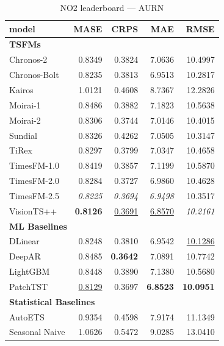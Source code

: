 \begin{table}[H]
\caption{NO2 leaderboard --- AURN}
\centering
\begin{small}
\begin{tabular}{lrrrr}
\toprule
model & MASE & CRPS & MAE & RMSE \\
\midrule
\multicolumn{5}{l}{\textbf{TSFMs}} \\
Chronos-2 & 0.8349 & 0.3824 & 7.0636 & 10.4997 \\
Chronos-Bolt & 0.8235 & 0.3813 & 6.9513 & 10.2817 \\
Kairos & 1.0121 & 0.4608 & 8.7367 & 12.2826 \\
Moirai-1 & 0.8486 & 0.3882 & 7.1823 & 10.5638 \\
Moirai-2 & 0.8306 & 0.3744 & 7.0146 & 10.4015 \\
Sundial & 0.8326 & 0.4262 & 7.0505 & 10.3147 \\
TiRex & 0.8297 & 0.3799 & 7.0347 & 10.4658 \\
TimesFM-1.0 & 0.8419 & 0.3857 & 7.1199 & 10.5870 \\
TimesFM-2.0 & 0.8284 & 0.3727 & 6.9860 & 10.4628 \\
TimesFM-2.5 & \textit{0.8225} & \textit{0.3694} & \textit{6.9498} & 10.3517 \\
VisionTS++ & \textbf{0.8126} & \underline{0.3691} & \underline{6.8570} & \textit{10.2161} \\
\midrule
\multicolumn{5}{l}{\textbf{ML Baselines}} \\
DLinear & 0.8248 & 0.3810 & 6.9542 & \underline{10.1286} \\
DeepAR & 0.8485 & \textbf{0.3642} & 7.0891 & 10.7742 \\
LightGBM & 0.8448 & 0.3890 & 7.1380 & 10.5680 \\
PatchTST & \underline{0.8129} & 0.3697 & \textbf{6.8523} & \textbf{10.0951} \\
\midrule
\multicolumn{5}{l}{\textbf{Statistical Baselines}} \\
AutoETS & 0.9354 & 0.4598 & 7.9174 & 11.1349 \\
Seasonal Naive & 1.0626 & 0.5472 & 9.0285 & 13.0410 \\
\bottomrule
\end{tabular}
\end{small}
\end{table}